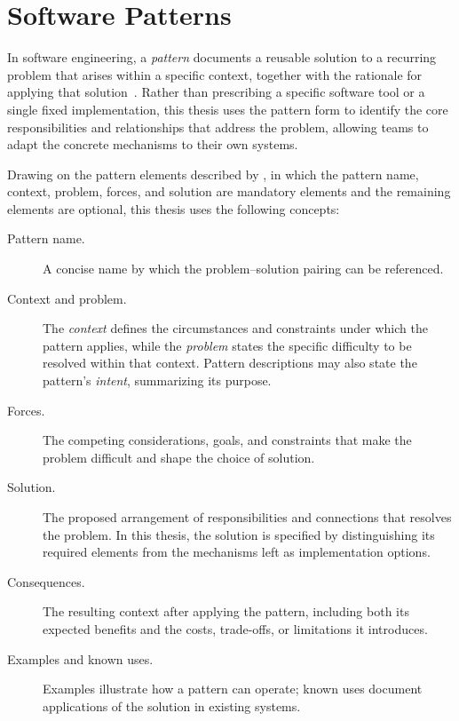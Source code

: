 \section{Software Patterns}
\label{sec:background-patterns}

In software engineering, a \emph{pattern} documents a reusable solution to a
recurring problem that arises within a specific context, together with the
rationale for applying that solution~\parencite{Meszaros:PatternWriting:1997}.
Rather than prescribing a specific software tool or a single fixed
implementation, this thesis uses the pattern form to identify the core
responsibilities and relationships that address the problem, allowing teams to
adapt the concrete mechanisms to their own systems.

Drawing on the pattern elements described by
\textcite{Meszaros:PatternWriting:1997}, in which the pattern name, context,
problem, forces, and solution are mandatory elements and the remaining elements
are optional, this thesis uses the following concepts:
\begin{description}
  \item[Pattern name.] A concise name by which the problem--solution pairing
    can be referenced.
  \item[Context and problem.] The \emph{context} defines the circumstances and
    constraints under which the pattern applies, while the \emph{problem}
    states the specific difficulty to be resolved within that context. Pattern
    descriptions may also state the pattern's \emph{intent}, summarizing its
    purpose.
  \item[Forces.] The competing considerations, goals, and constraints that make
    the problem difficult and shape the choice of solution.
  \item[Solution.] The proposed arrangement of responsibilities and connections
    that resolves the problem. In this thesis, the solution is specified by
    distinguishing its required elements from the mechanisms left as
    implementation options.
  \item[Consequences.] The resulting context after applying the pattern,
    including both its expected benefits and the costs, trade-offs, or
    limitations it introduces.
  \item[Examples and known uses.] Examples illustrate how a pattern can
    operate; known uses document applications of the solution in existing
    systems.
\end{description}

